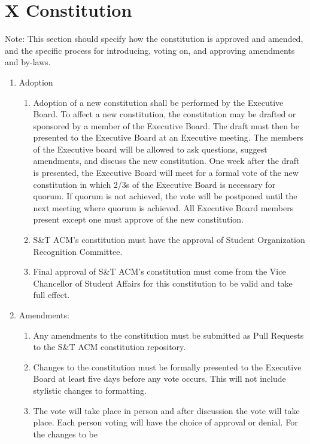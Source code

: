 
\section{X \textendash{} Constitution}
Note:  This section should specify how the constitution is approved and amended,
and the specific process for introducing, voting on, and approving amendments
and by-laws.
\begin{enumerate}
  \item Adoption
    \begin{enumerate}
      \item Adoption of a new constitution shall be performed by the Executive
        Board. To affect a new constitution, the constitution may be drafted or
        sponsored by a member of the Executive Board. The draft must then be
        presented to the Executive Board at an Executive meeting. The members of
        the Executive board will be allowed to ask questions, suggest
        amendments, and discuss the new constitution. One week after the draft
        is presented, the Executive Board will meet for a formal vote of the new
        constitution in which 2/3s of the Executive Board is necessary for
        quorum. If quorum is not achieved, the vote will be postponed until the
        next meeting where quorum is achieved. All Executive Board members
        present except one must approve of the new constitution.
      \item	S\&T ACM’s constitution must have the approval of Student
      Organization Recognition Committee.
      \item	Final approval of S\&T ACM’s constitution must come from the
      Vice Chancellor of Student Affairs for this constitution to be valid and
      take full effect.
    \end{enumerate}
  \item	Amendments:
    \begin{enumerate}
      \item Any amendments to the constitution must be submitted as Pull
      Requests to the S\&T ACM constitution repository.
      \item Changes to the constitution must be formally presented to the
      Executive Board at least five days before any vote occurs. This will not
      include stylistic changes to formatting.
      \item The vote will take place in
      person and after discussion the vote will take place. Each person voting
      will have the choice of approval or denial. For the changes to be

\end{enumerate}
\end{enumerate}
